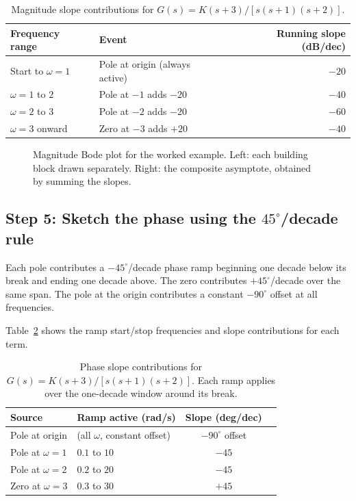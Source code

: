 \documentclass[12pt]{article}
\newcommand{\figplaceholder}[2][3in]{%
  \begin{center}
  \fbox{\parbox{#1}{\centering\vspace{0.5in}\textit{[Figure: #2]}\vspace{0.5in}}}
  \end{center}
}
\begin{document}
\begin{table}[htbp]
\centering
\caption{Magnitude slope contributions for $G(s) = K(s+3)/[s(s+1)(s+2)]$.}
\label{tab:example_mag_slopes}
\begin{tabular}{@{}llr@{}}
\toprule
Frequency range & Event & Running slope (dB/dec) \\
\midrule
Start to $\omega = 1$  & Pole at origin (always active) & $-20$ \\
$\omega = 1$ to $2$    & Pole at $-1$ adds $-20$        & $-40$ \\
$\omega = 2$ to $3$    & Pole at $-2$ adds $-20$        & $-60$ \\
$\omega = 3$ onward    & Zero at $-3$ adds $+20$        & $-40$ \\
\bottomrule
\end{tabular}
\end{table}

\begin{figure}[htbp]
  \figplaceholder[5.5in]{Bode magnitude plot for $G(s)=K(s+3)/[s(s+1)(s+2)]$,
    $K=1$: (a)~individual component asymptotes; (b)~composite asymptote.
    [Nise Fig.~10.11]}
  \caption{Magnitude Bode plot for the worked example.  Left: each building
    block drawn separately.  Right: the composite asymptote, obtained by
    summing the slopes.}
  \label{fig:example_magnitude}
\end{figure}

\subsection*{Step 5: Sketch the phase using the $45^\circ$/decade rule}

Each pole contributes a $-45^\circ$/decade phase ramp beginning one decade
below its break and ending one decade above.  The zero contributes
$+45^\circ$/decade over the same span.  The pole at the origin contributes a
constant $-90^\circ$ offset at all frequencies.

Table~\ref{tab:example_phase_slopes} shows the ramp start/stop frequencies
and slope contributions for each term.

\begin{table}[htbp]
\centering
\caption{Phase slope contributions for $G(s) = K(s+3)/[s(s+1)(s+2)]$.
  Each ramp applies over the one-decade window around its break.}
\label{tab:example_phase_slopes}
\begin{tabular}{@{}llcc@{}}
\toprule
Source & Ramp active (rad/s) & Slope (deg/dec) \\
\midrule
Pole at origin & (all $\omega$, constant offset) & $-90^\circ$ offset \\
Pole at $\omega = 1$ & $0.1$ to $10$   & $-45$ \\
Pole at $\omega = 2$ & $0.2$ to $20$   & $-45$ \\
Zero at $\omega = 3$ & $0.3$ to $30$   & $+45$ \\
\bottomrule
\end{tabular}
\end{table}
\end{document}
